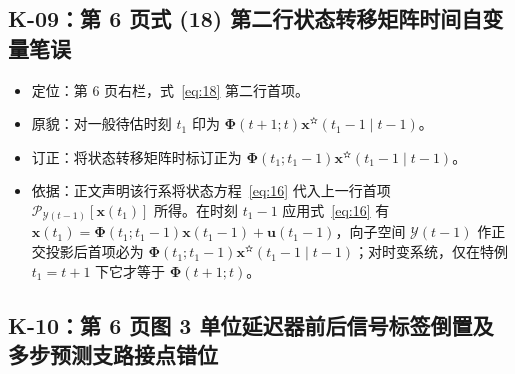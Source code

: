 \subsection{K-09：第 6 页式 (18) 第二行状态转移矩阵时间自变量笔误}\label{sec:k09}

\begin{itemize}
\item 定位：第 6 页右栏，式~\eqref{eq:18} 第二行首项。
\item 原貌：对一般待估时刻 $t_1$ 印为 $\bm{\Phi}(t + 1; t)\bm{x}^{\text{✫}}(t_1 - 1 \mid t - 1)$。
\item 订正：将状态转移矩阵时标订正为 $\bm{\Phi}(t_1; t_1 - 1)\bm{x}^{\text{✫}}(t_1 - 1 \mid t - 1)$。
\item 依据：正文声明该行系将状态方程~\eqref{eq:16} 代入上一行首项 $\mathscr{P}_{\mathcal{Y}(t-1)}[\bm{x}(t_1)]$ 所得。在时刻 $t_1 - 1$ 应用式~\eqref{eq:16} 有 $\bm{x}(t_1) = \bm{\Phi}(t_1; t_1 - 1)\bm{x}(t_1 - 1) + \bm{u}(t_1 - 1)$，向子空间 $\mathcal{Y}(t - 1)$ 作正交投影后首项必为 $\bm{\Phi}(t_1; t_1 - 1)\bm{x}^{\text{✫}}(t_1 - 1 \mid t - 1)$；对时变系统，仅在特例 $t_1 = t + 1$ 下它才等于 $\bm{\Phi}(t + 1; t)$。
\end{itemize}

\subsection{K-10：第 6 页图 3 单位延迟器前后信号标签倒置及多步预测支路接点错位}\label{sec:k10}


